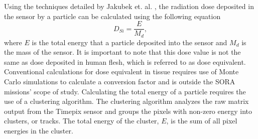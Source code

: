 
Using the techniques detailed by Jakubek et. al. \cite{Jakubek-Analysis}, the radiation dose deposited in the sensor by a particle can be calculated using the following equation
\begin{equation*}
  D_{Si} = \dfrac{E}{M_d},
\end{equation*}
where $E$ is the total energy that a particle deposited into the sensor and $M_d$ is the mass of the sensor.
It is important to note that this dose value is not the same as dose deposited in human flesh, which is referred to as dose equivalent.
Conventional calculations for dose equivalent in tissue requires use of Monte Carlo simulations to calculate a conversion factor \cite{Stuart-Thesis} and is outside the SORA missions' scope of study.
Calculating the total energy of a particle requires the use of a clustering algorithm.
The clustering algorithm analyzes the raw matrix output from the Timepix sensor and groups the pixels with non-zero energy into clusters, or tracks.
The total energy of the cluster, $E$, is the sum of all pixel energies in the cluster.

